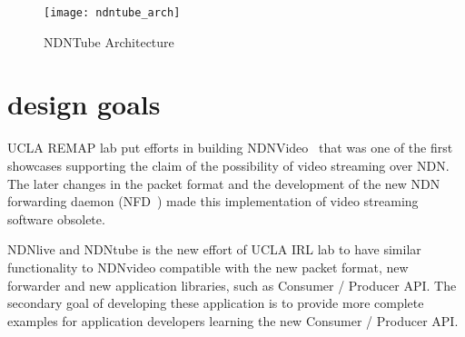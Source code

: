 
\begin{figure*}[htbp]
  \centering
  \texttt{[image: ndntube\_arch]}
  \caption{NDNTube Architecture}
  \label{fig:ndntube_arch}
\end{figure*}

\section{design goals} %
\label{sec:design_goals}
UCLA REMAP lab put efforts in building NDNVideo~\cite{ndnvideo} that was one of the first showcases supporting the claim of the possibility of video streaming over NDN. The later changes in the packet format and the development of the new NDN forwarding daemon (NFD~\cite{nfd-guide}) made this implementation of video streaming software obsolete. 

NDNlive and NDNtube is the new effort of UCLA IRL lab to have similar functionality to NDNvideo compatible with the new packet format, new forwarder and new application libraries, such as Consumer / Producer API. The secondary goal of developing these application is to provide more complete examples for application developers learning the new Consumer / Producer API.

